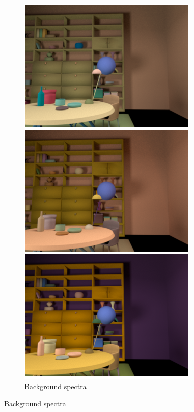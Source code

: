 \documentclass{jov}
\begin{document}
\begin{figure}
\begin{subfigure}[b]{0.18 \textwidth}
        \label{fig:targetVariation}
    \end{subfigure}
    ~
    \begin{subfigure}[b]{0.18 \textwidth}
    \centering
        \caption{Background spectra}
        \includegraphics[width=\textwidth]{../FiguresDraft4/Figure5/Figure5_b.png}

\end{subfigure}
\end{figure}
\end{document}
